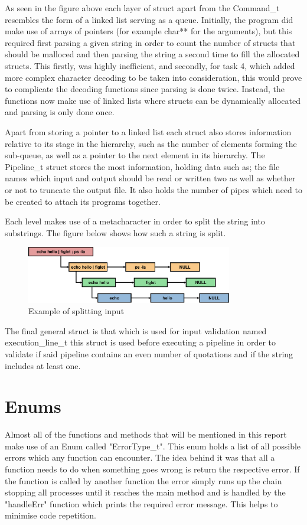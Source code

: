 \documentclass[12pt, a4paper]{report}
\begin{document}
As seen in the figure above each layer of struct apart from the Command\_t resembles the form of a linked list serving as a queue. Initially, the program did make use of arrays of pointers (for example char** for the arguments), but this required first parsing a given string in order to count the number of structs that should be malloced and then parsing the string a second time to fill the allocated structs. This firstly, was highly inefficient, and secondly, for task 4, which added more complex character decoding to be taken into consideration, this would prove to complicate the decoding functions since parsing is done twice. Instead, the functions now make use of linked lists where structs can be dynamically allocated and parsing is only done once.

Apart from storing a pointer to a linked list each struct also stores information relative to its stage in the hierarchy, such as the number of elements forming the sub-queue, as well as a pointer to the next element in its hierarchy. The Pipeline\_t struct stores the most information, holding data such as; the file names which input and output should be read or written two as well as whether or not to truncate the output file. It also holds the number of pipes which need to be created to attach its programs together. 

Each level makes use of a metacharacter in order to split the string into substrings. The figure below shows how such a string is split.
\begin{figure}[!htp]
    \centering
    \includegraphics[width=9cm]
    {Diagrams/Structs_Text.png}
    \caption{Example of splitting input}
\end{figure}

The final general struct is that which is used for input validation named execution\_line\_t this struct is used before executing a pipeline in order to validate if said pipeline contains an even number of quotations and if the string includes at least one.

\section{Enums}
Almost all of the functions and methods that will be mentioned in this report make use of an Enum called "ErrorType\_t". This enum holds a list of all possible errors which any function can encounter. The idea behind it was that all a function needs to do when something goes wrong is return the respective error. If the function is called by another function the error simply runs up the chain stopping all processes until it reaches the main method and is handled by the "handleErr" function which prints the required error message. This helps to minimise code repetition.
\end{document}
